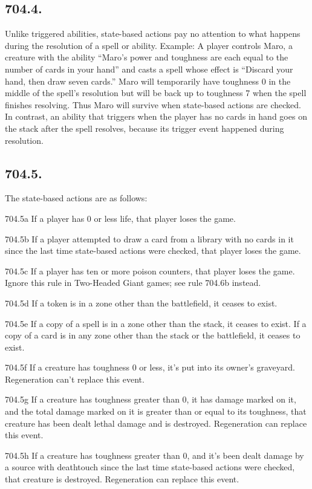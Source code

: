 \subsection*{704.4.}
Unlike triggered abilities, state-based actions pay no attention to what happens during the resolution of a spell or ability.
Example: A player controls Maro, a creature with the ability “Maro’s power and toughness are each equal to the number of cards in your hand” and casts a spell whose effect is “Discard your hand, then draw seven cards.” Maro will temporarily have toughness 0 in the middle of the spell’s resolution but will be back up to toughness 7 when the spell finishes resolving. Thus Maro will survive when state-based actions are checked. In contrast, an ability that triggers when the player has no cards in hand goes on the stack after the spell resolves, because its trigger event happened during resolution.

\subsection*{704.5.}
The state-based actions are as follows:

704.5a If a player has 0 or less life, that player loses the game.

704.5b If a player attempted to draw a card from a library with no cards in it since the last time state-based actions were checked, that player loses the game.

704.5c If a player has ten or more poison counters, that player loses the game. Ignore this rule in Two-Headed Giant games; see rule 704.6b instead.

704.5d If a token is in a zone other than the battlefield, it ceases to exist.

704.5e If a copy of a spell is in a zone other than the stack, it ceases to exist. If a copy of a card is in any zone other than the stack or the battlefield, it ceases to exist.

704.5f If a creature has toughness 0 or less, it’s put into its owner’s graveyard. Regeneration can’t replace this event.

704.5g If a creature has toughness greater than 0, it has damage marked on it, and the total damage marked on it is greater than or equal to its toughness, that creature has been dealt lethal damage and is destroyed. Regeneration can replace this event.

704.5h If a creature has toughness greater than 0, and it’s been dealt damage by a source with deathtouch since the last time state-based actions were checked, that creature is destroyed. Regeneration can replace this event.

